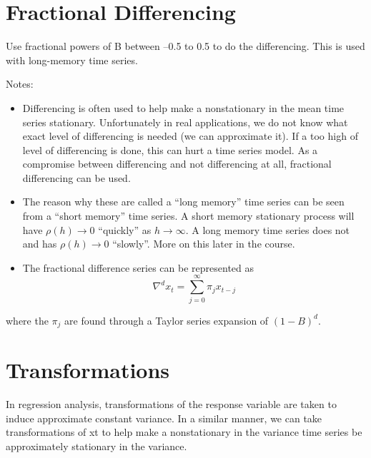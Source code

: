 \documentclass[
]{book}
\providecommand{\tightlist}{%
  \setlength{\itemsep}{0pt}\setlength{\parskip}{0pt}}
\theoremstyle{definition}
\theoremstyle{definition}
\theoremstyle{definition}
\theoremstyle{definition}
\theoremstyle{remark}
\begin{document}
\hypertarget{fractional-differencing}{%
\section{Fractional Differencing}\label{fractional-differencing}}

Use fractional powers of B between --0.5 to 0.5 to do the differencing. This is used with long-memory time series.

Notes:

\begin{itemize}
\tightlist
\item
  Differencing is often used to help make a nonstationary in the mean time series stationary. Unfortunately in real applications, we do not know what exact level of differencing is needed (we can approximate it). If a too high of level of differencing is done, this can hurt a time series model. As a compromise between differencing and not differencing at all, fractional differencing can be used.\\
\item
  The reason why these are called a ``long memory'' time series can be seen from a ``short memory'' time series. A short memory stationary process will have \(\rho(h)\to 0\) ``quickly'' as \(h\to \infty\). A long memory time series does not and has \(\rho(h)\to 0\) ``slowly''. More on this later in the course.
\item
  The fractional difference series can be represented as \[\nabla^dx_t=\sum_{j=0}^{\infty}\pi_jx_{t-j}\]
\end{itemize}

where the \(\pi_j\) are found through a Taylor series expansion of \((1-B)^d\).

\hypertarget{transformations}{%
\section{Transformations}\label{transformations}}

In regression analysis, transformations of the response variable are taken to induce approximate constant variance. In a similar manner, we can take transformations of xt to help make a nonstationary in the variance time series be approximately stationary in the variance.
\end{document}
